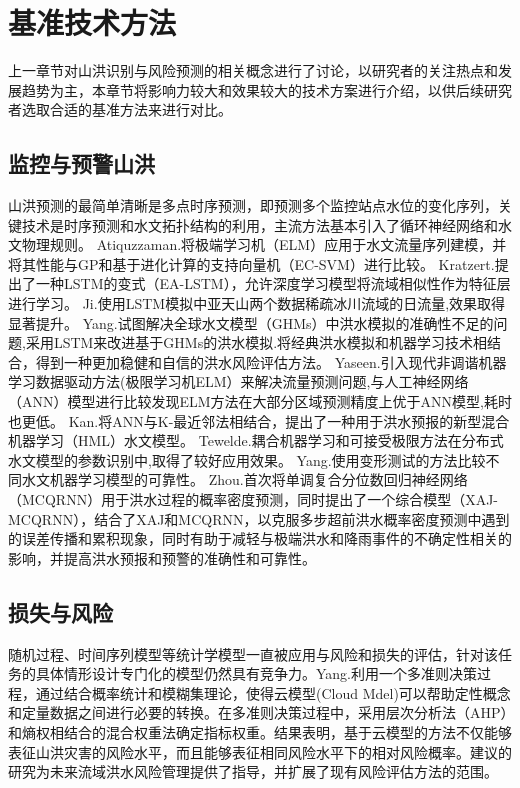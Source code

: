 \documentclass{ctexart}
\begin{document}
\section{基准技术方法}

上一章节对山洪识别与风险预测的相关概念进行了讨论，以研究者的关注热点和发展趋势为主，本章节将影响力较大和效果较大的技术方案进行介绍，以供后续研究者选取合适的基准方法来进行对比。

\subsection{监控与预警山洪}

山洪预测的最简单清晰是多点时序预测，即预测多个监控站点水位的变化序列，关键技术是时序预测和水文拓扑结构的利用，主流方法基本引入了循环神经网络和水文物理规则。
Atiquzzaman.\cite{atiquzzaman2018robustness}将极端学习机（ELM）应用于水文流量序列建模，并将其性能与GP和基于进化计算的支持向量机（EC-SVM）进行比较。
Kratzert.\cite{kratzert2019towards}提出了一种LSTM的变式（EA-LSTM），允许深度学习模型将流域相似性作为特征层进行学习。
Ji.\cite{ji2021adaptability}使用LSTM模拟中亚天山两个数据稀疏冰川流域的日流量,效果取得显著提升。
Yang.\cite{yang2019evaluation}试图解决全球水文模型（GHMs）中洪水模拟的准确性不足的问题,采用LSTM来改进基于GHMs的洪水模拟.将经典洪水模拟和机器学习技术相结合，得到一种更加稳健和自信的洪水风险评估方法。
Yaseen.\cite{yaseen2018non}引入现代非调谐机器学习数据驱动方法(极限学习机ELM）来解决流量预测问题,与人工神经网络（ANN）模型进行比较发现ELM方法在大部分区域预测精度上优于ANN模型,耗时也更低。
Kan.\cite{kan2020hybrid}将ANN与K-最近邻法相结合，提出了一种用于洪水预报的新型混合机器学习（HML）水文模型。
Tewelde.\cite{teweldebrhan2020coupled}耦合机器学习和可接受极限方法在分布式水文模型的参数识别中,取得了较好应用效果。
Yang.\cite{yang2021reliability}使用变形测试的方法比较不同水文机器学习模型的可靠性。
Zhou.\cite{zhou2021short}首次将单调复合分位数回归神经网络（MCQRNN）用于洪水过程的概率密度预测，同时提出了一个综合模型（XAJ-MCQRNN），结合了XAJ和MCQRNN，以克服多步超前洪水概率密度预测中遇到的误差传播和累积现象，同时有助于减轻与极端洪水和降雨事件的不确定性相关的影响，并提高洪水预报和预警的准确性和可靠性。



\subsection{损失与风险}

随机过程、时间序列模型等统计学模型一直被应用与风险和损失的评估，针对该任务的具体情形设计专门化的模型仍然具有竞争力。Yang.\cite{yang2018cloud}利用一个多准则决策过程，通过结合概率统计和模糊集理论，使得云模型(Cloud Mdel)可以帮助定性概念和定量数据之间进行必要的转换。在多准则决策过程中，采用层次分析法（AHP）和熵权相结合的混合权重法确定指标权重。结果表明，基于云模型的方法不仅能够表征山洪灾害的风险水平，而且能够表征相同风险水平下的相对风险概率。建议的研究为未来流域洪水风险管理提供了指导，并扩展了现有风险评估方法的范围。
\end{document}

